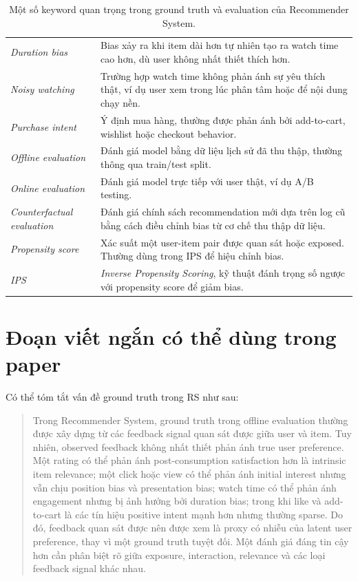 \documentclass[12pt,a4paper]{article}
\begin{document}
\begin{table}[h!]
\begin{tabular}{p{4cm} p{9cm}}
\textit{Duration bias} & Bias xảy ra khi item dài hơn tự nhiên tạo ra watch time cao hơn, dù user không nhất thiết thích hơn. \\
\textit{Noisy watching} & Trường hợp watch time không phản ánh sự yêu thích thật, ví dụ user xem trong lúc phân tâm hoặc để nội dung chạy nền. \\
\textit{Purchase intent} & Ý định mua hàng, thường được phản ánh bởi add-to-cart, wishlist hoặc checkout behavior. \\
\textit{Offline evaluation} & Đánh giá model bằng dữ liệu lịch sử đã thu thập, thường thông qua train/test split. \\
\textit{Online evaluation} & Đánh giá model trực tiếp với user thật, ví dụ A/B testing. \\
\textit{Counterfactual evaluation} & Đánh giá chính sách recommendation mới dựa trên log cũ bằng cách điều chỉnh bias từ cơ chế thu thập dữ liệu. \\
\textit{Propensity score} & Xác suất một user-item pair được quan sát hoặc exposed. Thường dùng trong IPS để hiệu chỉnh bias. \\
\textit{IPS} & \textit{Inverse Propensity Scoring}, kỹ thuật đánh trọng số ngược với propensity score để giảm bias. \\
\bottomrule
\end{tabular}
\caption{Một số keyword quan trọng trong ground truth và evaluation của Recommender System.}
\label{tab:evaluation_keywords}
\end{table}

\section{Đoạn viết ngắn có thể dùng trong paper}

Có thể tóm tắt vấn đề ground truth trong RS như sau:

\begin{quote}
Trong Recommender System, ground truth trong offline evaluation thường được xây dựng từ các feedback signal quan sát được giữa user và item. 
Tuy nhiên, observed feedback không nhất thiết phản ánh true user preference. 
Một rating có thể phản ánh post-consumption satisfaction hơn là intrinsic item relevance; một click hoặc view có thể phản ánh initial interest nhưng vẫn chịu position bias và presentation bias; watch time có thể phản ánh engagement nhưng bị ảnh hưởng bởi duration bias; trong khi like và add-to-cart là các tín hiệu positive intent mạnh hơn nhưng thường sparse. 
Do đó, feedback quan sát được nên được xem là proxy có nhiễu của latent user preference, thay vì một ground truth tuyệt đối. 
Một đánh giá đáng tin cậy hơn cần phân biệt rõ giữa exposure, interaction, relevance và các loại feedback signal khác nhau.
\end{quote}
\end{document}
